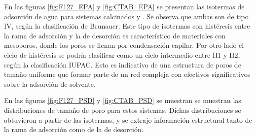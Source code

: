 		 \pagebreak

		 En las figuras \ref{fig:F127_EPA} y \ref{fig:CTAB_EPA} se presentan las isotermas de adsorción de agua para sistemas calcinados \pdmF\space y \pdmC. Se observa que ambas son de tipo IV, según la clasificación de Brunauer\cite{Gregg1967,Violi2015,Fuertes2010}. Este tipo de isotermas con histéresis entre la rama de adsorción y la de desorción es característico de materiales con mesoporos, donde los poros se llenan por condensación capilar. Por otro lado el ciclo de histéresis se podría clasificar como un ciclo intermedio entre H1 y H2, según la clasificación IUPAC\cite{Thommes2015}. Esto es indicativo de una estructura de poros de tamaño uniforme que formar parte de un red compleja con efectivos significativos sobre la adsorción de solvente.\cite{Thommes2015,Gregg1967,Lowell2004,Sing1985}

		 En las figuras \ref{fig:F127_PSD} y \ref{fig:CTAB_PSD} se muestran se muestran las distribuciones de tamaño de poro para estos sistemas. Dichas distribuciones se obtuvieron a partir de las isotermas, y se extrajo información estructural tanto de la rama de adsorción como de la de desorción.


